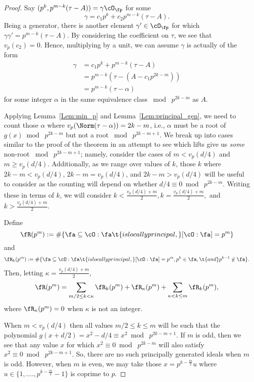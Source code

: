 \documentclass[11pt, proquest]{uwthesis}
\begin{document}
\begin{proof}
Say $(p^k,p^{m-k}(\tau-A)) = \gamma\cO_\fp$ for some
\[
\gamma = c_1p^k + c_2p^{m-k}(\tau-A).
\]
Being a generator, there is another element $\gamma'\in\cO_\fp$ for which $\gamma\gamma' = p^{m-k}(\tau-A)$.
By considering the coefficient on $\tau$, we see that $v_p(c_2) = 0$.
Hence, multiplying by a unit, we can assume $\gamma$ is actually of the form
\begin{align*}
\gamma &= c_1p^k + p^{m-k}(\tau-A)\\
  &= p^{m-k}(\tau - (A -c_1p^{2k-m}))\\
  &= p^{m-k}(\tau - \alpha)
\end{align*}
for some integer $\alpha$ in the same equivalence class $\bmod\;p^{2k-m}$ as $A$.

Applying Lemma~\ref{Lem:min_p} and Lemma~\ref{Lem:principal_gen}, we need to count those $\alpha$ where $v_p(\Norm(\tau-\alpha)) = 2k-m$, i.e., $\alpha$ must be a root of $g(x)\bmod\;p^{2k-m}$ but not a root $\bmod\;p^{2k-m+1}$.
We break up into cases similar to the proof of the theorem in an attempt to see which lifts give us {\it some} non-root $\bmod\; p^{2k-m+1}$; namely, consider the cases of $m < v_p(d/4)$ and $m\geq v_p(d/4)$.
Additionally, as we range over values of $k$, those $k$ where $2k-m< v_p(d/4)$, $2k-m=v_p(d/4)$, and $2k-m>v_p(d/4)$ will be useful to consider as the counting will depend on whether $d/4\equiv 0\bmod\; p^{2k-m}$.
Writing these in terms of $k$, we will consider $k < \frac{v_p(d/4)+m}{2}, k = \frac{v_p(d/4)+m}{2},$ and $k > \frac{v_p(d/4)+m}{2}$.

Define
\[
\fR(p^m) := \#\{\fa\subseteq\cO:\fa\t{ is locally principal, }[\cO:\fa]=p^m\}
\]
and
\[
\fR_k(p^m) := \#\{\fa\subseteq \cO:\fa\t{ is locally principal, } [\cO:\fa]=p^m, p^k\in\fa, \t{ and }p^{k-1}\not\in\fa\}.
\]
Then, letting $\kappa= \frac{v_p(d/4)+m}{2}$,
\[
\fR(p^m) = \sum_{m/2\leq k< \kappa} \fR_k(p^m) + \fR_\kappa(p^m) + \sum_{\kappa<k\leq m} \fR_k(p^m),
\]
where $\fR_\kappa(p^m)=0$ when $\kappa$ is not an integer.

When $m< v_p(d/4)$ then all values $m/2\leq k\leq m$ will be such that the polynomial $g(x+d/2) = x^2 - d/4 \equiv x^2 \bmod\; p^{2k-m+1}$.
If $m$ is odd, then we see that any value $x$ for which $x^2\equiv 0\bmod\; p^{2k-m}$ will also satisfy $x^2 \equiv 0\bmod\; p^{2k-m+1}$.
So, there are no such principally generated ideals when $m$ is odd.
However, when $m$ is even, we may take those $x = p^{k-\frac{m}{2}}u$ where $u\in \{1,.\ldots, p^{k-\frac{m}{2}}-1\}$ is coprime to $p$.


\end{proof}
\end{document}
